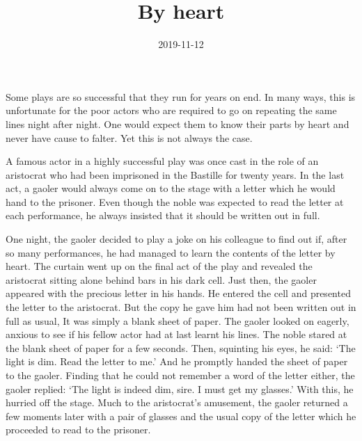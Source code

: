 \documentclass[a4paper,12pt]{article}
\title{By heart}
\author{}
\date{2019-11-12}
\begin{document}
\maketitle


Some plays are so successful that they run for years on end. In many ways, this is unfortunate for the poor actors who are required to go on repeating the same lines night after night. One would expect them to know their parts by heart and never have cause to falter. Yet this is not always the case.

A famous actor in a highly successful play was once cast in the role of an aristocrat who had been imprisoned in the Bastille for twenty years. In the last act, a gaoler would always come on to the stage with a letter which he would hand to the prisoner. Even though the noble was expected to read the letter at each performance, he always insisted that it should be written out in full.

One night, the gaoler decided to play a joke on his colleague to find out if, after so many performances, he had managed to learn the contents of the letter by heart. The curtain went up on the final act of the play and revealed the aristocrat sitting alone behind bars in his dark cell. Just then, the gaoler appeared with the precious letter in his hands. He entered the cell and presented the letter to the aristocrat. But the copy he gave him had not been written out in full as usual, It was simply a blank sheet of paper. The gaoler looked on eagerly, anxious to see if his fellow actor had at last learnt his lines. The noble stared at the blank sheet of paper for a few seconds. Then, squinting his eyes, he said: `The light is dim. Read the letter to me.' And he promptly handed the sheet of paper to the gaoler. Finding that he could not remember a word of the letter either, the gaoler replied: `The light is indeed dim, sire. I must get my glasses.' With this, he hurried off the stage. Much to the aristocrat's amusement, the gaoler returned a few moments later with a pair of glasses and the usual copy of the letter which he proceeded to read to the prisoner.
\end{document}
